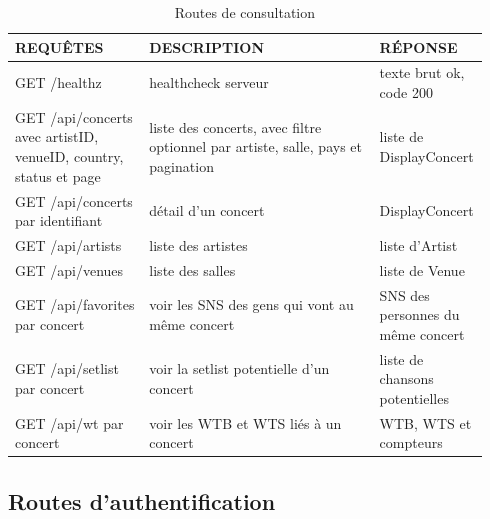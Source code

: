 \documentclass[11pt,a4paper]{article}
\begin{document}
\small
\begin{table}[H]
\centering
\caption{Routes de consultation}\label{tab:routes_consultation}
\begin{tabular}{|>{\raggedright\arraybackslash}m{0.28\linewidth}|>{\raggedright\arraybackslash}m{0.48\linewidth}|>{\raggedright\arraybackslash}m{0.18\linewidth}|}
\hline
\textbf{REQUÊTES} & \textbf{DESCRIPTION} & \textbf{RÉPONSE} \\
\hline
GET /healthz & healthcheck serveur & texte brut ok, code 200 \\
\hline
GET /api/concerts avec artistID, venueID, country, status et page & liste des concerts, avec filtre optionnel par artiste, salle, pays et pagination & liste de DisplayConcert \\
\hline
GET /api/concerts par identifiant & détail d'un concert & DisplayConcert \\
\hline
GET /api/artists & liste des artistes & liste d'Artist \\
\hline
GET /api/venues & liste des salles & liste de Venue \\
\hline
GET /api/favorites par concert & voir les SNS des gens qui vont au même concert & SNS des personnes du même concert \\
\hline
GET /api/setlist par concert & voir la setlist potentielle d'un concert & liste de chansons potentielles \\
\hline
GET /api/wt par concert & voir les WTB et WTS liés à un concert & WTB, WTS et compteurs \\
\hline
\end{tabular}
\end{table}
\normalsize

\subsection{Routes d'authentification}
\end{document}
